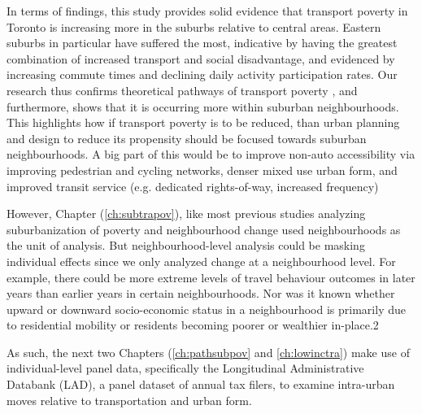 In terms of findings, this study provides solid evidence that transport poverty in Toronto is increasing more in the suburbs relative to central areas. Eastern suburbs in particular have suffered the most, indicative by having the greatest combination of increased transport and social disadvantage, and evidenced by increasing commute times and declining daily activity participation rates. Our research thus confirms theoretical pathways of transport poverty \cite{lucas_transport_2012}, and furthermore, shows that it is occurring more within suburban neighbourhoods. This highlights how if transport poverty is to be reduced, than urban planning and design to reduce its propensity should be focused towards suburban neighbourhoods. A big part of this would be to improve non-auto accessibility via improving pedestrian and cycling networks, denser mixed use urban form, and improved transit service (e.g. dedicated rights-of-way, increased frequency)

However, Chapter (\ref{ch:subtrapov}), like most previous studies analyzing suburbanization of poverty and neighbourhood change \cite{ades_are_2012,breau_pulling_2018,grant_changing_2020} used neighbourhoods as the unit of analysis. But neighbourhood-level analysis could be masking individual effects since we only analyzed change at a neighbourhood level. For example, there could be more extreme levels of travel behaviour outcomes in later years than earlier years in certain neighbourhoods. Nor was it known whether upward or downward socio-economic status in a neighbourhood is primarily due to residential mobility or residents becoming poorer or wealthier in-place.2

As such, the next two Chapters (\ref{ch:pathsubpov} and \ref{ch:lowinctra}) make use of individual-level panel data, specifically the Longitudinal Administrative Databank (LAD), a panel dataset of annual tax filers, to examine intra-urban moves relative to transportation and urban form.

